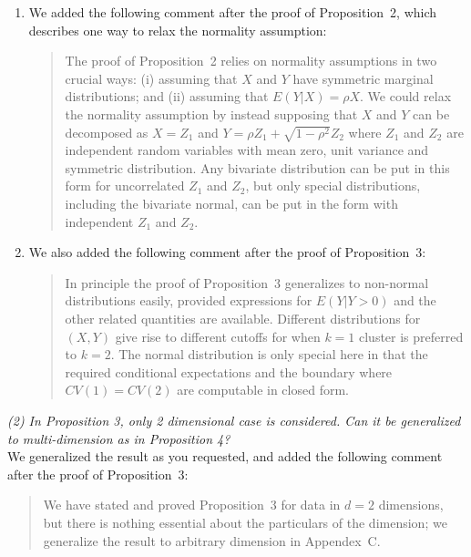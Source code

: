 \documentclass[11pt]{article}
\begin{document}
\begin{enumerate}
\item We added the following comment after the proof of Proposition~2, which
describes one way to relax the normality assumption:

\begin{quote}
The proof of Proposition~2 relies on normality assumptions
in two crucial ways: (i) assuming that $X$ and $Y$ have symmetric marginal
distributions; and (ii) assuming that $E(Y|X) = \rho X$. We could relax the
normality assumption by instead supposing that $X$ and $Y$ can be decomposed
as $X = Z_1$ and $Y = \rho Z_1 + \sqrt{1-\rho^2}Z_2$ where $Z_1$ and $Z_2$ are
independent random variables with mean zero, unit variance and symmetric
distribution. Any bivariate distribution can be put in this form for
uncorrelated $Z_1$ and $Z_2$, but only special distributions, including the
bivariate normal, can be put in the form with independent $Z_1$ and $Z_2$.
\end{quote}

\item We also added the following comment after the proof of Proposition~3:

\begin{quote}
In principle the proof of Proposition~3 generalizes to non-normal
distributions easily, provided expressions for $E(Y | Y > 0)$ and the other
related quantities are available. Different distributions for $(X,Y)$ give
rise to different cutoffs for when $k = 1$ cluster is preferred to $k = 2$.
The normal distribution is only special here in that the required conditional
expectations and the boundary where $CV(1) = CV(2)$ are computable in closed
form. 
\end{quote}

\end{enumerate}


\noindent
\emph{(2) In Proposition 3, only 2 dimensional case is considered. Can
it be generalized to multi-dimension as in Proposition 4?}
\\

We generalized the result as you requested, and added the following
comment after the proof of Proposition~3:

\begin{quote}
We have stated and proved Proposition~3 for data in $d = 2$
dimensions, but there is nothing essential about the particulars of the
dimension; we generalize the result to arbitrary dimension in
Appendex~C.
\end{quote}
\end{document}
